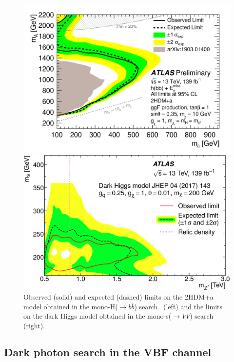 \documentclass{moriond}
\begin{document}
\begin{figure} [htb]
\begin{minipage}{0.45\linewidth}
\centerline{\includegraphics[width=0.9\linewidth]{monoh}}
\end{minipage}
\begin{minipage}{0.45\linewidth}
\centerline{\includegraphics[width=0.9\linewidth]{monos}}
\end{minipage}
\caption[]{Observed (solid) and expected (dashed) limits on the 2HDM+a model obtained in the mono-H($\rightarrow b\overline{b}$) search~\cite{monoh} (left) and the limits on the dark Higgs model obtained in the mono-s($\rightarrow VV$) search~\cite{monos} (right).}
\label{fig:mono_h_s}
\end{figure}

\subsection{Dark photon search in the VBF channel}
\end{document}
